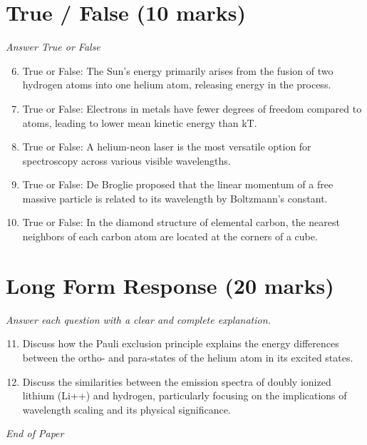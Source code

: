 \documentclass[12pt]{article}
\begin{document}
\section*{True / False (10 marks)}
\textit{Answer True or False}
\begin{enumerate}[label=\arabic*.]
\setcounter{enumi}{5}
\item True or False: The Sun's energy primarily arises from the fusion of two hydrogen atoms into one helium atom, releasing energy in the process.
\item True or False: Electrons in metals have fewer degrees of freedom compared to atoms, leading to lower mean kinetic energy than kT.
\item True or False: A helium-neon laser is the most versatile option for spectroscopy across various visible wavelengths.
\item True or False: De Broglie proposed that the linear momentum of a free massive particle is related to its wavelength by Boltzmann's constant.
\item True or False: In the diamond structure of elemental carbon, the nearest neighbors of each carbon atom are located at the corners of a cube.
\end{enumerate}

\section*{Long Form Response (20 marks)}
\textit{Answer each question with a clear and complete explanation.}
\begin{enumerate}[label=\arabic*.]
\setcounter{enumi}{10}
\item Discuss how the Pauli exclusion principle explains the energy differences between the ortho- and para-states of the helium atom in its excited states.
\item Discuss the similarities between the emission spectra of doubly ionized lithium (Li++) and hydrogen, particularly focusing on the implications of wavelength scaling and its physical significance.
\end{enumerate}

\vfill
\noindent\textit{End of Paper}
\end{document}
